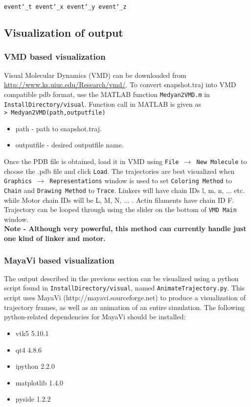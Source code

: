 \documentclass[11pt, oneside]{article}   	%
\begin{document}
\noindent\texttt{event\char`_t event\char`_x event\char`_y event\char`_z }\newline

\subsection{Visualization of output}
\subsubsection{VMD based visualization}
Visual Molecular Dynamics (VMD) can be downloaded from \url{http://www.ks.uiuc.edu/Research/vmd/}. To convert snapshot.traj into VMD compatible pdb format, use the MATLAB function \texttt{Medyan2VMD.m} in \texttt{InstallDirectory/visual}.
Function call in MATLAB is given as \\ \newline
\texttt{> Medyan2VMD(path,outputfile)}
\begin{itemize}
\item path - path to snapshot.traj.
\item outputfile - desired outputfile name.
\end{itemize}

\noindent Once the PDB file is obtained, load it in VMD using \texttt{File $\rightarrow$ New Molecule} to choose the  .pdb file and click \texttt{Load}. 
The trajectories are best visualized when \texttt{Graphics $\rightarrow$ Representations} window is used to set \texttt{Coloring Method} to \texttt{Chain} and \texttt{Drawing Method} to \texttt{Trace}. Linkers will have chain IDs l, m, n, ... etc. while Motor chain IDs will be L, M, N, ... . Actin filaments have chain ID F.  Trajectory can be looped through using the slider on the bottom of \texttt{VMD Main} window. \\ \newline
\textbf{Note -  Although very powerful, this method can currently handle just one kind of linker and motor.}

\subsubsection{MayaVi based visualization}
The output described in the previous section can be visualized using a python script found in \texttt{InstallDirectory/visual}, named \texttt{AnimateTrajectory.py}. This script uses MayaVi (http://mayavi.sourceforge.net) to produce a visualization of trajectory frames, as well as an animation of an entire simulation.
The following python-related dependencies for MayaVi should be installed:
\begin{itemize}
\item vtk5 5.10.1
\item qt4 4.8.6
\item ipython 2.2.0
\item matplotlib 1.4.0
\item pyside 1.2.2
\end{itemize}
\end{document}
